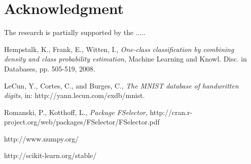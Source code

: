 \documentclass{llncs}
\begin{document}

\section*{Acknowledgment}

\noindent The research is partially supported by the .....

\begin{thebibliography}{1}

Hempstalk, K., Frank, E., Witten, I., \emph{One-class classification by combining density and class probability estimation}, Machine Learning and Knowl. Disc. in Databases, pp. 505-519, 2008.

LeCun, Y., Cortes, C., and Burges, C., \emph{The MNIST database of handwritten digits}, in: http://yann.lecun.com/exdb/mnist.

Romanski, P., Kotthoff, L., \emph{Package FSelector}, http://cran.r-project.org/web/packages/FSelector/FSelector.pdf

http://www.numpy.org/

http://scikit-learn.org/stable/

\end{thebibliography}
\end{document}
